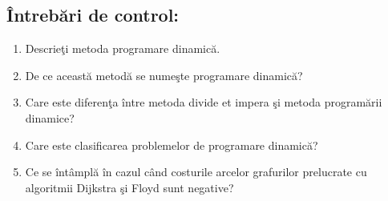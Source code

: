 \documentclass[14pt,a4paper]{extreport}
\begin{document}
\clearpage
\subsection*{ Întrebări de control: \\}
\begin{enumerate}
	\item Descrieţi metoda programare dinamică. 
	\item De ce această metodă se numeşte programare dinamică? 
	\item Care este diferenţa între metoda divide et impera şi metoda programării dinamice? 
	\item Care este clasificarea problemelor de programare dinamică? 
	\item Ce se întâmplă în cazul când costurile arcelor grafurilor prelucrate cu algoritmii Dijkstra şi Floyd sunt negative? 
\end{enumerate}
\end{document}
